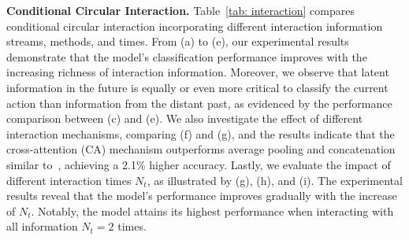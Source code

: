 \textbf{Conditional Circular Interaction.}
Table~\ref{tab: interaction} compares conditional circular interaction incorporating different interaction information streams, methods, and times. From (a) to (e), our experimental results demonstrate that the model's classification performance improves with the increasing richness of interaction information.
Moreover, we observe that latent information in the future is equally or even more critical to classify the current action than information from the distant past, as evidenced by the performance comparison between (c) and (e).
We also investigate the effect of different interaction mechanisms, comparing (f) and (g), and the results indicate that the cross-attention (CA) mechanism outperforms average pooling and concatenation similar to~\cite{oadtr}, achieving a 2.1\% higher accuracy.
Lastly, we evaluate the impact of different interaction times $N_t$, as illustrated by (g), (h), and (i). The experimental results reveal that the model's performance improves gradually with the increase of $N_t$. Notably, the model attains its highest performance when interacting with all information $N_t=2$ times.



